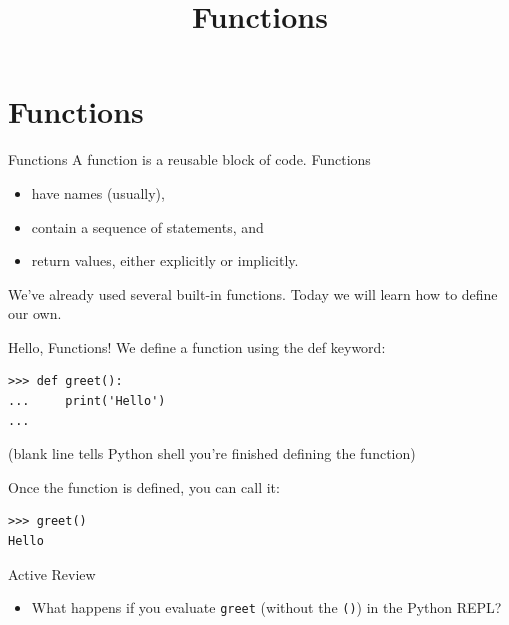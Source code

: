 \documentclass[smaller, aspectratio=1610]{beamer}
\date{}
\title{Functions}
\begin{document}
\maketitle

\section{Functions}
\label{sec:org677b849}

\begin{frame}[label={sec:org3803ae1}]{Functions}
A function is a reusable block of code. Functions

\begin{itemize}
\item have names (usually),
\item contain a sequence of statements, and
\item return values, either explicitly or implicitly.
\end{itemize}

We've already used several built-in functions. Today we will learn how to define our own.
\end{frame}

\begin{frame}[label={sec:org2f1645f},fragile]{Hello, Functions!}
 We define a function using the def keyword:

\lstset{language=Python,label= ,caption= ,captionpos=b,numbers=none}
\begin{lstlisting}
>>> def greet():
...     print('Hello')
...
\end{lstlisting}

(blank line tells Python shell you're finished defining the function)

Once the function is defined, you can call it:

\lstset{language=Python,label= ,caption= ,captionpos=b,numbers=none}
\begin{lstlisting}
>>> greet()
Hello
\end{lstlisting}

\begin{block}{Active Review}
\begin{itemize}
\item What happens if you evaluate \texttt{greet} (without the \texttt{()}) in the Python REPL?
\end{itemize}
\end{block}
\end{frame}
\end{document}
